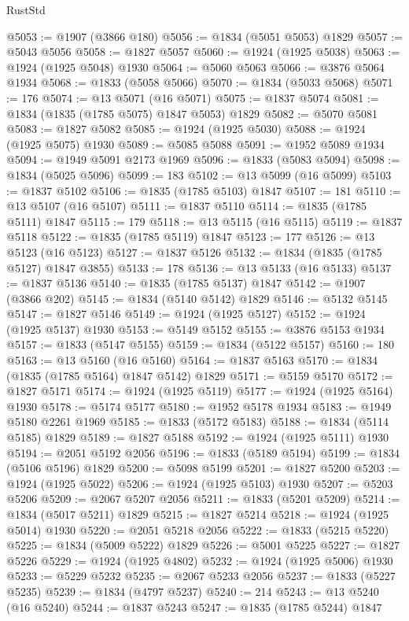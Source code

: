 \begin{lexlean}{RustStd}
\begin{coremodule}
@5053 := @1907 (@3866 @180)
@5056 := @1834 (@5051 @5053) @1829
@5057 := @5043 @5056
@5058 := @1827 @5057
@5060 := @1924 (@1925 @5038)
@5063 := @1924 (@1925 @5048) @1930
@5064 := @5060 @5063
@5066 := @3876 @5064 @1934
@5068 := @1833 (@5058 @5066)
@5070 := @1834 (@5033 @5068)
@5071 := 176
@5074 := @13 @5071 (@16 @5071)
@5075 := @1837 @5074
@5081 := @1834 (@1835 (@1785 @5075) @1847 @5053) @1829
@5082 := @5070 @5081
@5083 := @1827 @5082
@5085 := @1924 (@1925 @5030)
@5088 := @1924 (@1925 @5075) @1930
@5089 := @5085 @5088
@5091 := @1952 @5089 @1934
@5094 := @1949 @5091 @2173 @1969
@5096 := @1833 (@5083 @5094)
@5098 := @1834 (@5025 @5096)
@5099 := 183
@5102 := @13 @5099 (@16 @5099)
@5103 := @1837 @5102
@5106 := @1835 (@1785 @5103) @1847
@5107 := 181
@5110 := @13 @5107 (@16 @5107)
@5111 := @1837 @5110
@5114 := @1835 (@1785 @5111) @1847
@5115 := 179
@5118 := @13 @5115 (@16 @5115)
@5119 := @1837 @5118
@5122 := @1835 (@1785 @5119) @1847
@5123 := 177
@5126 := @13 @5123 (@16 @5123)
@5127 := @1837 @5126
@5132 := @1834 (@1835 (@1785 @5127) @1847 @3855)
@5133 := 178
@5136 := @13 @5133 (@16 @5133)
@5137 := @1837 @5136
@5140 := @1835 (@1785 @5137) @1847
@5142 := @1907 (@3866 @202)
@5145 := @1834 (@5140 @5142) @1829
@5146 := @5132 @5145
@5147 := @1827 @5146
@5149 := @1924 (@1925 @5127)
@5152 := @1924 (@1925 @5137) @1930
@5153 := @5149 @5152
@5155 := @3876 @5153 @1934
@5157 := @1833 (@5147 @5155)
@5159 := @1834 (@5122 @5157)
@5160 := 180
@5163 := @13 @5160 (@16 @5160)
@5164 := @1837 @5163
@5170 := @1834 (@1835 (@1785 @5164) @1847 @5142) @1829
@5171 := @5159 @5170
@5172 := @1827 @5171
@5174 := @1924 (@1925 @5119)
@5177 := @1924 (@1925 @5164) @1930
@5178 := @5174 @5177
@5180 := @1952 @5178 @1934
@5183 := @1949 @5180 @2261 @1969
@5185 := @1833 (@5172 @5183)
@5188 := @1834 (@5114 @5185) @1829
@5189 := @1827 @5188
@5192 := @1924 (@1925 @5111) @1930
@5194 := @2051 @5192 @2056
@5196 := @1833 (@5189 @5194)
@5199 := @1834 (@5106 @5196) @1829
@5200 := @5098 @5199
@5201 := @1827 @5200
@5203 := @1924 (@1925 @5022)
@5206 := @1924 (@1925 @5103) @1930
@5207 := @5203 @5206
@5209 := @2067 @5207 @2056
@5211 := @1833 (@5201 @5209)
@5214 := @1834 (@5017 @5211) @1829
@5215 := @1827 @5214
@5218 := @1924 (@1925 @5014) @1930
@5220 := @2051 @5218 @2056
@5222 := @1833 (@5215 @5220)
@5225 := @1834 (@5009 @5222) @1829
@5226 := @5001 @5225
@5227 := @1827 @5226
@5229 := @1924 (@1925 @4802)
@5232 := @1924 (@1925 @5006) @1930
@5233 := @5229 @5232
@5235 := @2067 @5233 @2056
@5237 := @1833 (@5227 @5235)
@5239 := @1834 (@4797 @5237)
@5240 := 214
@5243 := @13 @5240 (@16 @5240)
@5244 := @1837 @5243
@5247 := @1835 (@1785 @5244) @1847

\end{coremodule}
\end{lexlean}
